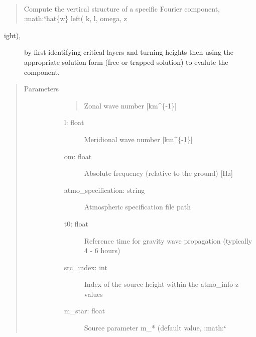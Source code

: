 \documentclass[letterpaper,10pt,english]{sphinxmanual}
\begin{document}
\begin{fulllineitems}
\label{\detokenize{stochprop.gravity:stochprop.gravity_waves.single_fourier_component}}~\begin{quote}

Compute the vertical structure of a specific Fourier component, :math:{\color{red}\bfseries{}{}`}hat\{w\} left( k, l, omega, z
\end{quote}
\begin{description}
\item[{ight), }] \leavevmode
by first identifying critical layers and turning heights then using the appropriate solution form (free or 
trapped solution) to evalute the component.

\end{description}
\begin{quote}\begin{description}
\item[{Parameters}] \leavevmode\begin{description}
\item[{}] \leavevmode\begin{quote}

Zonal wave number {[}km\textasciicircum{}\{-1\}{]}
\end{quote}
\begin{description}
\item[{l: float}] \leavevmode
Meridional wave number {[}km\textasciicircum{}\{-1\}{]}

\item[{om: float}] \leavevmode
Absolute frequency (relative to the ground) {[}Hz{]}

\item[{atmo\_specification: string}] \leavevmode
Atmospheric specification file path

\item[{t0: float}] \leavevmode
Reference time for gravity wave propagation (typically 4 - 6 hours)

\item[{src\_index: int}] \leavevmode
Index of the source height within the atmo\_info z values

\item[{m\_star: float}] \leavevmode
Source parameter m\_* (default value, :math:{\color{red}\bfseries{}{}`}


\end{description}
\end{description}
\end{description}
\end{quote}
\end{fulllineitems}
\end{document}
